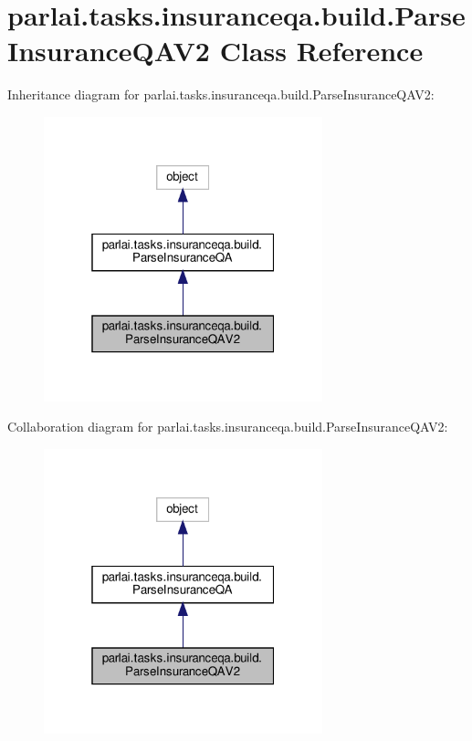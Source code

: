\hypertarget{classparlai_1_1tasks_1_1insuranceqa_1_1build_1_1ParseInsuranceQAV2}{}\section{parlai.\+tasks.\+insuranceqa.\+build.\+Parse\+Insurance\+Q\+A\+V2 Class Reference}
\label{classparlai_1_1tasks_1_1insuranceqa_1_1build_1_1ParseInsuranceQAV2}


Inheritance diagram for parlai.\+tasks.\+insuranceqa.\+build.\+Parse\+Insurance\+Q\+A\+V2\+:\nopagebreak
\begin{figure}[H]
\begin{center}
\leavevmode
\includegraphics[width=229pt]{d0/d7c/classparlai_1_1tasks_1_1insuranceqa_1_1build_1_1ParseInsuranceQAV2__inherit__graph}
\end{center}
\end{figure}


Collaboration diagram for parlai.\+tasks.\+insuranceqa.\+build.\+Parse\+Insurance\+Q\+A\+V2\+:
\nopagebreak
\begin{figure}[H]
\begin{center}
\leavevmode
\includegraphics[width=229pt]{df/d63/classparlai_1_1tasks_1_1insuranceqa_1_1build_1_1ParseInsuranceQAV2__coll__graph}
\end{center}
\end{figure}
